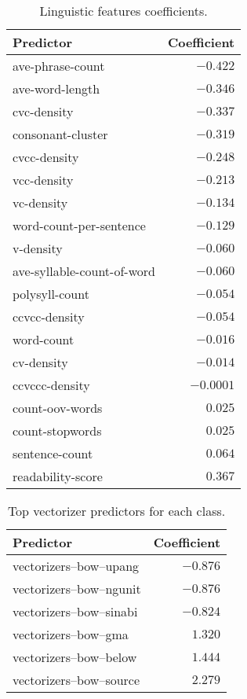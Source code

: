 \documentclass[conference]{IEEEtran}
\begin{document}
\begin{table}[!t]
\caption{Linguistic features coefficients.}
\label{tab::lang_coef}
\begin{center}
\begin{tabular}{|l|r|}
\hline
\textbf{Predictor} & \textbf{Coefficient} \\ 
\hline
ave-phrase-count & $-0.422$ \\
ave-word-length & $-0.346$ \\
cvc-density & $-0.337$ \\ 
consonant-cluster & $-0.319$ \\ 
cvcc-density & $-0.248$ \\ 
vcc-density & $-0.213$ \\ 
vc-density & $-0.134$ \\ 
word-count-per-sentence & $-0.129$ \\ 
v-density & $-0.060$ \\ 
ave-syllable-count-of-word & $-0.060$ \\ 
polysyll-count & $-0.054$ \\ 
ccvcc-density & $-0.054$ \\ 
word-count & $-0.016$ \\ 
cv-density & $-0.014$ \\ 
ccvccc-density & $-0.0001$ \\ 
count-oov-words & $0.025$ \\ 
count-stopwords & $0.025$ \\ 
sentence-count & $0.064$ \\ 
readability-score & $0.367$ \\
\hline
\end{tabular}
\end{center}
\end{table}

\begin{table}[!t]
\caption{Top vectorizer predictors for each class.}
\label{tab::vec_coef}
\begin{center}
\begin{tabular}{|l|r|}
\hline
\textbf{Predictor} & \textbf{Coefficient} \\ 
\hline
vectorizers--bow--upang & $-0.876$ \\
vectorizers--bow--ngunit & $-0.876$ \\
vectorizers--bow--sinabi & $-0.824$ \\
vectorizers--bow--gma & $1.320$ \\
vectorizers--bow--below & $1.444$ \\
vectorizers--bow--source & $2.279$ \\
\hline
\end{tabular}
\end{center}
\end{table}
\end{document}
